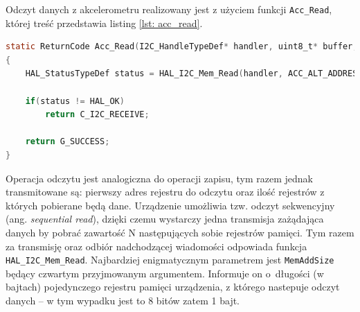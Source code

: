 Odczyt danych z akcelerometru realizowany jest z użyciem funkcji \texttt{Acc\_Read}, której treść przedstawia listing \ref{lst: acc_read}.
\begin{lstlisting}[language=C,
caption={Odczyt wartości z rejestru pamięci akcelerometru},
label={lst: acc_read}]
static ReturnCode Acc_Read(I2C_HandleTypeDef* handler, uint8_t* buffer, uint8_t reg, uint8_t bytes_number)
{
	HAL_StatusTypeDef status = HAL_I2C_Mem_Read(handler, ACC_ALT_ADDRESS, reg, 1, buffer, bytes_number, ACC_I2C_TIMEOUT);

	if(status != HAL_OK)
		return C_I2C_RECEIVE;

	return G_SUCCESS;
}
\end{lstlisting}
Operacja odczytu jest analogiczna do operacji zapisu, tym razem jednak transmitowane są: pierwszy adres rejestru do odczytu oraz ilość rejestrów z których pobierane będą dane. Urządzenie umożliwia tzw. odczyt sekwencyjny (ang. \textit{sequential read}), dzięki czemu wystarczy jedna transmisja zażądająca danych by pobrać zawartość N następujących sobie rejestrów pamięci. Tym razem za transmisję oraz odbiór nadchodzącej wiadomości odpowiada funkcja \texttt{HAL\_I2C\_Mem\_Read}. Najbardziej enigmatycznym parametrem jest \texttt{MemAddSize} będący czwartym przyjmowanym argumentem. Informuje on o~długości (w bajtach) pojedynczego rejestru pamięci urządzenia, z którego nastepuje odczyt danych \cite{um1725} -- w tym wypadku jest to 8 bitów zatem 1 bajt.

